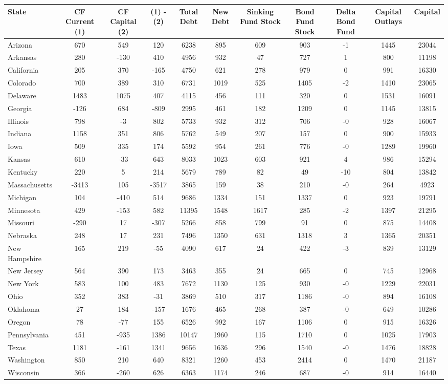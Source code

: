 \begin{tabularx}{\linewidth}{@{}lCCCCCCCCCC@{}}

\toprule
{State}&{CF Current (1)}&{CF Capital (2)}&{(1) - (2)}&{Total Debt}&{New Debt}&{Sinking Fund Stock}&{Bond Fund Stock}&{Delta Bond Fund}&{Capital Outlays}&{Capital} \tabularnewline
\midrule \addlinespace[\belowrulesep]
Arizona&670&549&120&6238&895&609&903&-1&1445&23044 \tabularnewline
Arkansas&280&-130&410&4956&932&47&727&1&800&11198 \tabularnewline
California&205&370&-165&4750&621&278&979&0&991&16330 \tabularnewline
Colorado&700&389&310&6731&1019&525&1405&-2&1410&23065 \tabularnewline
Delaware&1483&1075&407&4115&456&111&320&0&1531&16091 \tabularnewline
Georgia&-126&684&-809&2995&461&182&1209&0&1145&13815 \tabularnewline
Illinois&798&-3&802&5733&932&312&706&-0&928&16067 \tabularnewline
Indiana&1158&351&806&5762&549&207&157&0&900&15933 \tabularnewline
Iowa&509&335&174&5592&954&261&776&-0&1289&19960 \tabularnewline
Kansas&610&-33&643&8033&1023&603&921&4&986&15294 \tabularnewline
Kentucky&220&5&214&5679&789&82&49&-10&804&13842 \tabularnewline
Massachusetts&-3413&105&-3517&3865&159&38&210&-0&264&4923 \tabularnewline
Michigan&104&-410&514&9686&1334&151&1337&0&923&19791 \tabularnewline
Minnesota&429&-153&582&11395&1548&1617&285&-2&1397&21295 \tabularnewline
Missouri&-290&17&-307&5266&858&799&91&0&875&14408 \tabularnewline
Nebraska&248&17&231&7496&1350&631&1318&3&1365&20351 \tabularnewline
New Hampshire&165&219&-55&4090&617&24&422&-3&839&13129 \tabularnewline
New Jersey&564&390&173&3463&355&24&665&0&745&12968 \tabularnewline
New York&583&100&483&7672&1130&125&930&-0&1229&22031 \tabularnewline
Ohio&352&383&-31&3869&510&317&1186&-0&894&16108 \tabularnewline
Oklahoma&27&184&-157&1676&465&268&387&-0&649&10286 \tabularnewline
Oregon&78&-77&155&6526&992&167&1106&0&915&16326 \tabularnewline
Pennsylvania&451&-935&1386&10147&1960&115&1710&0&1025&17903 \tabularnewline
Texas&1181&-161&1341&9656&1636&296&1540&-0&1476&18828 \tabularnewline
Washington&850&210&640&8321&1260&453&2414&0&1470&21187 \tabularnewline
Wisconsin&366&-260&626&6363&1174&246&687&-0&914&16440 \tabularnewline
\bottomrule 

\end{tabularx}


